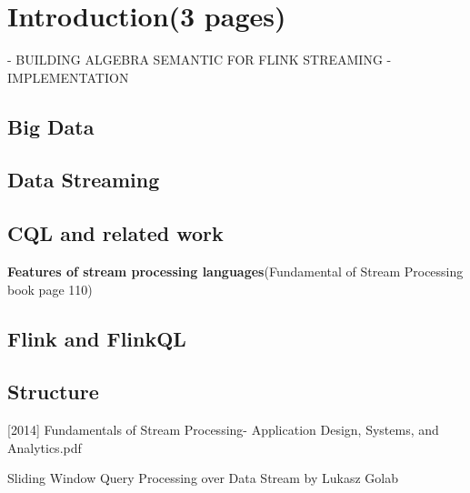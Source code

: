 
\chapter{Introduction(3 pages)}

\ifpdf
    \graphicspath{{Chapter1/Figs/Raster/}{Chapter1/Figs/PDF/}{Chapter1/Figs/}}
\else
    \graphicspath{{Chapter1/Figs/Vector/}{Chapter1/Figs/}}
\fi

- BUILDING ALGEBRA SEMANTIC FOR FLINK STREAMING
- IMPLEMENTATION
\section*{Big Data}
\section*{Data Streaming}
\section*{CQL and related work}
\textbf{Features of stream processing languages}(Fundamental of Stream Processing book page 110)


\section*{Flink and FlinkQL}
\section*{Structure}


[2014] Fundamentals of Stream Processing- Application Design, Systems, and Analytics.pdf \citep{Henrique:2014}




Sliding Window Query Processing over Data Stream 
by
Lukasz Golab


